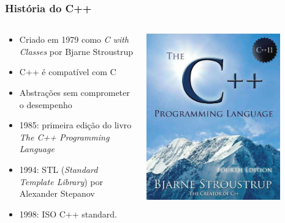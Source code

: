 \documentclass[xcolor={usenames,dvipsnames},10pt,presentation,aspectratio=169]{beamer}
\begin{document}
\begin{frame}
  \frametitle{História do C++}
    \begin{columns}
      \begin{column}{0.7\textwidth}
        \begin{itemize}
          \item Criado em 1979 como \emph{C with Classes} por Bjarne Stroustrup
          \item C++ é compatível com C
          \item Abstrações sem comprometer o desempenho 
          \item 1985: primeira edição do livro \emph{The C++ Programming Language}
          \item 1994: STL (\emph{Standard Template Library}) por Alexander Stepanov
          \item 1998: ISO C++ standard.
        \end{itemize}
     \end{column}
      \begin{column}{0.3\textwidth}
  \begin{center}
	\includegraphics[width=0.8\textwidth]{4thEnglish.jpeg}
  \end{center}
      \end{column}
    \end{columns}
\end{frame}
\end{document}

